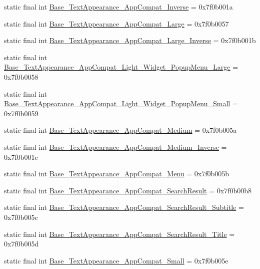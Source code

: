 \begin{CompactItemize}
\item 
static final int \hyperlink{classandroid_1_1support_1_1v4_1_1_r_1_1style_23ddf5494572965f4d9ae94f4d4147ce}{Base\_\-TextAppearance\_\-AppCompat\_\-Inverse} = 0x7f0b001a
\item 
static final int \hyperlink{classandroid_1_1support_1_1v4_1_1_r_1_1style_42033b88257f851fbfb7dc79afca341d}{Base\_\-TextAppearance\_\-AppCompat\_\-Large} = 0x7f0b0057
\item 
static final int \hyperlink{classandroid_1_1support_1_1v4_1_1_r_1_1style_6742043bf2fb777be66d5f06e9dea4c7}{Base\_\-TextAppearance\_\-AppCompat\_\-Large\_\-Inverse} = 0x7f0b001b
\item 
static final int \hyperlink{classandroid_1_1support_1_1v4_1_1_r_1_1style_e7f8d60d2e75184a97794afbdaf67d10}{Base\_\-TextAppearance\_\-AppCompat\_\-Light\_\-Widget\_\-PopupMenu\_\-Large} = 0x7f0b0058
\item 
static final int \hyperlink{classandroid_1_1support_1_1v4_1_1_r_1_1style_5ce3dcb3ee72262941ab8b75a342e6c3}{Base\_\-TextAppearance\_\-AppCompat\_\-Light\_\-Widget\_\-PopupMenu\_\-Small} = 0x7f0b0059
\item 
static final int \hyperlink{classandroid_1_1support_1_1v4_1_1_r_1_1style_a462f9f096d3b86856887940341da7ab}{Base\_\-TextAppearance\_\-AppCompat\_\-Medium} = 0x7f0b005a
\item 
static final int \hyperlink{classandroid_1_1support_1_1v4_1_1_r_1_1style_0be9ea90ffe216b41b96969f7cce5961}{Base\_\-TextAppearance\_\-AppCompat\_\-Medium\_\-Inverse} = 0x7f0b001c
\item 
static final int \hyperlink{classandroid_1_1support_1_1v4_1_1_r_1_1style_3cdb2872e5ba85ac2b5a6d082169c05e}{Base\_\-TextAppearance\_\-AppCompat\_\-Menu} = 0x7f0b005b
\item 
static final int \hyperlink{classandroid_1_1support_1_1v4_1_1_r_1_1style_e19a4de5c800bb06d82625cf31c01ab9}{Base\_\-TextAppearance\_\-AppCompat\_\-SearchResult} = 0x7f0b00b8
\item 
static final int \hyperlink{classandroid_1_1support_1_1v4_1_1_r_1_1style_3e92be53e5cc823edc41231366da7489}{Base\_\-TextAppearance\_\-AppCompat\_\-SearchResult\_\-Subtitle} = 0x7f0b005c
\item 
static final int \hyperlink{classandroid_1_1support_1_1v4_1_1_r_1_1style_ad7a0366548afa040936e8601e80c2e7}{Base\_\-TextAppearance\_\-AppCompat\_\-SearchResult\_\-Title} = 0x7f0b005d
\item 
static final int \hyperlink{classandroid_1_1support_1_1v4_1_1_r_1_1style_89b45ae664babb6bda99ca5c6f8fe77e}{Base\_\-TextAppearance\_\-AppCompat\_\-Small} = 0x7f0b005e

\end{CompactItemize}

